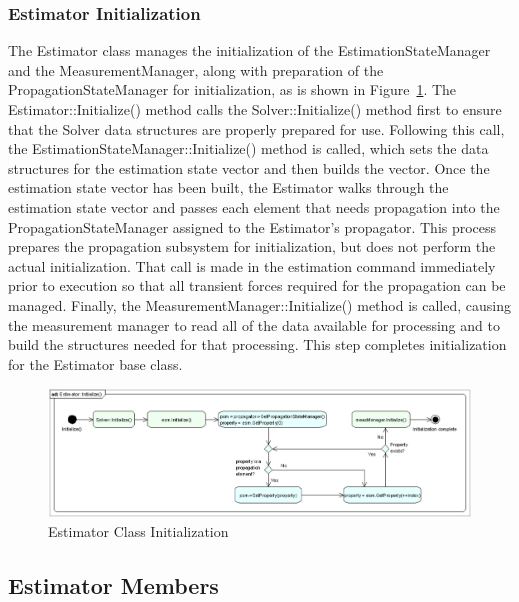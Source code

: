 \subsubsection{Estimator Initialization}

The Estimator class manages the initialization of the EstimationStateManager and the MeasurementManager, along with preparation of the PropagationStateManager for initialization, as is shown in Figure~\ref{fig:EstimatorInitialize}.  The Estimator::Initialize() method calls the Solver::Initialize() method first to ensure that the Solver data structures are properly prepared for use.  Following this call, the EstimationStateManager::Initialize() method is called, which sets the data structures for the estimation state vector and then builds the vector.  Once the estimation state vector has been built, the Estimator walks through the estimation state vector and passes each element that needs propagation into the PropagationStateManager assigned to the Estimator's propagator.  This process prepares the propagation subsystem for initialization, but does not perform the actual initialization.  That call is made in the estimation command immediately prior to execution so that all transient forces required for the propagation can be managed.  Finally, the MeasurementManager::Initialize() method is called, causing the measurement manager to read all of the data available for processing and to build the structures needed for that processing.  This step completes initialization for the Estimator base class.

\begin{figure}[htbp]
\begin{center}
\includegraphics[scale=0.45]{Images/EstimatorInitialize.eps}
\caption{\label{fig:EstimatorInitialize}Estimator Class Initialization}
\end{center}
\end{figure}

\subsection{Estimator Members}


